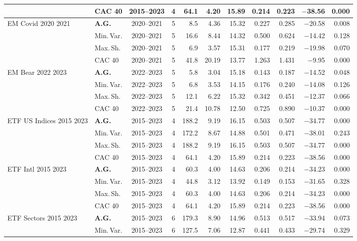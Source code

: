 \begin{longtable}{p{2.6cm} l c c r r r r r r r}
 & CAC 40 & 2015--2023 & 4 & 64.1 & 4.20 & 15.89 & 0.214 & 0.223 & $-$38.56 & 0.000 \\
\midrule
EM Covid 2020 2021 & \textbf{A.G.} & 2020--2021 & 5 & 8.5 & 4.36 & 15.32 & 0.227 & 0.285 & $-$20.58 & 0.008 \\
 & Min.\,Var. & 2020--2021 & 5 & 16.6 & 8.44 & 14.32 & 0.500 & 0.624 & $-$14.42 & 0.128 \\
 & Max.\,Sh. & 2020--2021 & 5 & 6.9 & 3.57 & 15.31 & 0.177 & 0.219 & $-$19.98 & 0.070 \\
 & CAC 40 & 2020--2021 & 5 & 41.8 & 20.19 & 13.77 & 1.263 & 1.431 & $-$9.95 & 0.000 \\
\midrule
EM Bear 2022 2023 & \textbf{A.G.} & 2022--2023 & 5 & 5.8 & 3.04 & 15.18 & 0.143 & 0.187 & $-$14.52 & 0.048 \\
 & Min.\,Var. & 2022--2023 & 5 & 6.8 & 3.53 & 14.15 & 0.176 & 0.240 & $-$14.08 & 0.126 \\
 & Max.\,Sh. & 2022--2023 & 5 & 12.1 & 6.22 & 15.32 & 0.342 & 0.451 & $-$12.37 & 0.066 \\
 & CAC 40 & 2022--2023 & 5 & 21.4 & 10.78 & 12.50 & 0.725 & 0.890 & $-$10.37 & 0.000 \\
\midrule
ETF US Indices 2015 2023 & \textbf{A.G.} & 2015--2023 & 4 & 188.2 & 9.19 & 16.15 & 0.503 & 0.507 & $-$34.77 & 0.000 \\
 & Min.\,Var. & 2015--2023 & 4 & 172.2 & 8.67 & 14.88 & 0.501 & 0.471 & $-$38.01 & 0.243 \\
 & Max.\,Sh. & 2015--2023 & 4 & 188.2 & 9.19 & 16.15 & 0.503 & 0.507 & $-$34.77 & 0.000 \\
 & CAC 40 & 2015--2023 & 4 & 64.1 & 4.20 & 15.89 & 0.214 & 0.223 & $-$38.56 & 0.000 \\
\midrule
ETF Intl 2015 2023 & \textbf{A.G.} & 2015--2023 & 4 & 60.3 & 4.00 & 14.63 & 0.206 & 0.214 & $-$34.23 & 0.000 \\
 & Min.\,Var. & 2015--2023 & 4 & 44.8 & 3.12 & 13.92 & 0.149 & 0.153 & $-$31.65 & 0.328 \\
 & Max.\,Sh. & 2015--2023 & 4 & 60.3 & 4.00 & 14.63 & 0.206 & 0.214 & $-$34.23 & 0.000 \\
 & CAC 40 & 2015--2023 & 4 & 64.1 & 4.20 & 15.89 & 0.214 & 0.223 & $-$38.56 & 0.000 \\
\midrule
ETF Sectors 2015 2023 & \textbf{A.G.} & 2015--2023 & 6 & 179.3 & 8.90 & 14.96 & 0.513 & 0.517 & $-$33.94 & 0.073 \\
 & Min.\,Var. & 2015--2023 & 6 & 127.5 & 7.06 & 12.87 & 0.441 & 0.433 & $-$29.74 & 0.329 \\

\end{longtable}
